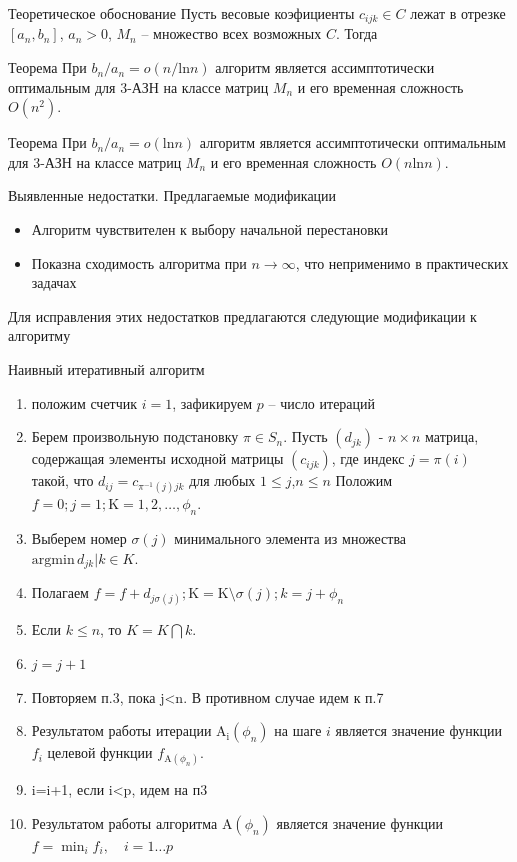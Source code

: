 \documentclass[12pt]{beamer}
\newcommand\Fontvi{\fontsize{8}{7.2}\selectfont}
\begin{document}
\begin{frame}{Теоретическое обоснование}
Пусть весовые коэфициенты $c_{ijk} \in C$ лежат в отрезке $[a_n, b_n]$, $a_n>0$, $M_n$ -- множество всех возможных $C$. Тогда
\begin{block}{Теорема}
При $b_n / a_n = o(n/ \mathrm{ln} n)$ алгоритм является ассимптотически оптимальным для 3-АЗН на классе матриц $M_n$
и его временная сложность  $O(n^2)$.
\end{block}
\begin{block}{Теорема}
При $b_n / a_n = o(\mathrm{ln} n)$ алгоритм является ассимптотически оптимальным для 3-АЗН на классе матриц $M_n$
и его временная сложность  $O(n \mathrm{ln} n)$. 
\end{block}
\end{frame}

\begin{frame}{Выявленные недостатки. Предлагаемые модификации}
\begin{itemize}
\item Алгоритм чувствителен к выбору начальной перестановки
\item Показна сходимость алгоритма при $n \rightarrow \infty$, что неприменимо в практических задачах
\end{itemize}

Для исправления этих недостатков предлагаются следующие модификации к алгоритму
\end{frame}

\begin{frame}{Наивный итеративный алгоритм}
\Fontvi
\begin{enumerate}
\item положим счетчик $i=1$, зафикируем $p$ -- число итераций
\item Берем произвольную подстановку $\pi \in S_n$. Пусть $(d_{jk})$ - $n \times n$ 
матрица, содержащая элементы исходной матрицы $(c_{ijk})$, где индекс $j=\pi(i)$ такой, что
$
d_{ij} = c_{\pi^{-1}(j)jk}
$
для любых $1 \leq j$,$n \leq n$
Положим $f = 0 ; j =1 ; \mathrm{K}={1,2, \ldots , \phi_n}$. 
\item Выберем номер $\sigma(j)$ минимального элемента из множества $\mathrm{argmin} \, {d_{jk} | k \in K}$.
\item Полагаем $f = f + d_{j \sigma (j)} ; \mathrm{K} = \mathrm{K}  \setminus  {\sigma(j)} ; k=j+\phi_n$
\item Если $k \leq n $, то $K = K \bigcap {k}$.
\item $j = j + 1$
\item Повторяем п.3, пока j<n. В противном случае идем к п.7
\item Результатом работы итерации  $\mathrm{A_i}(\phi_n)$ на шаге $i$ является значение функции $f_i$ целевой функции   
$f_{\mathrm{A}(\phi_n)}$. 
\item i=i+1, если i<p, идем на п3
\item Результатом работы алгоритма $\mathrm{A}(\phi_n)$ является значение функции $f=\min_{i} {f_i}, \quad i=1 \ldots p$ 
\end{enumerate}
\end{frame}
\end{document}
